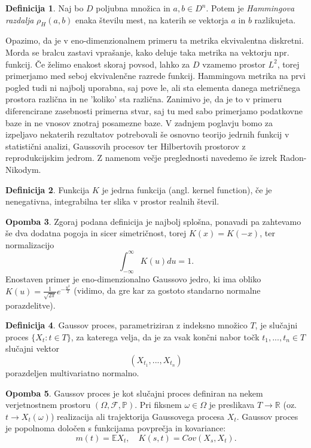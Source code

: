 \documentclass[12pt,a4paper]{amsart}
\theoremstyle{definition} %
\newtheorem{definicija}{Definicija}[section]
\newtheorem{opomba}[definicija]{Opomba}
\theoremstyle{plain} %
\begin{document}
\begin{definicija}
Naj bo $D$ poljubna množica in $a , b \in D^n$. Potem je  \textit{Hammingova razdalja} $\rho_H(a,b)$ enaka številu mest, na katerih se vektorja $a$ in $b$ razlikujeta.
\end{definicija}
Opazimo, da je v eno-dimenzionalnem primeru  ta metrika ekvivalentna diskretni. Morda se bralcu zastavi vprašanje, kako deluje taka metrika na vektorju npr. funkcij. Če želimo enakost skoraj povsod, lahko za $D$ vzamemo prostor $L^2$, torej primerjamo med seboj ekvivalenčne razrede funkcij.  Hammingova metrika na prvi pogled tudi ni najbolj uporabna, saj pove le, ali sta elementa danega metričnega prostora različna in ne 'koliko' sta različna. Zanimivo je, da je to v primeru diferencirane zasebnosti primerna stvar, saj tu med sabo primerjamo podatkovne baze in ne vnosov znotraj posamezne baze. 
\newline
\newline
V zadnjem poglavju bomo za izpeljavo nekaterih rezultatov potrebovali še osnovno teorijo jedrnih funkcij v statistični analizi, Gaussovih procesov ter Hilbertovih prostorov z reprodukcijskim jedrom. Z namenom večje preglednosti navedemo še izrek Radon-Nikodym.
\begin{definicija}
Funkcija $K$ je jedrna funkcija (angl. kernel function), če je nenegativna, integrabilna ter slika v prostor realnih števil.
\end{definicija}
\begin{opomba}
Zgoraj podana definicija je najbolj splošna, ponavadi pa zahtevamo še dva dodatna pogoja in sicer simetričnost, torej $K(x) = K(-x)$, ter normalizacijo
$$
\int_{-\infty}^{\infty} K(u)du=1.
$$
Enostaven primer je eno-dimenzionalno Gaussovo jedro, ki ima obliko $K(u)=\frac{1}{\sqrt{2\pi}}e^{-\frac{u^2}{2}}$ (vidimo, da gre kar za gostoto standarno normalne porazdelitve).
\end{opomba}
\begin{definicija}
Gaussov proces, parametriziran z indeksno množico $T$, je slučajni proces $\{X_t : t \in T\}$, za katerega velja, da je za vsak končni nabor točk $t_1,...,t_n \in T$ slučajni vektor
$$
(X_{t_1},...,X_{t_n})
$$
porazdeljen multivariatno normalno.
\end{definicija}
\begin{opomba}
Gaussov proces je kot slučajni proces definiran na nekem verjetnostnem prostoru  $(\Omega, \mathcal{F}, \mathbb{P})$. Pri fiksnem $\omega \in \Omega$ je preslikava $T \rightarrow \mathbb{R}$ (oz. $t \rightarrow X_t(\omega)$) realizacija ali trajektorija Gaussovega procesa $X_t$. Gaussov proces je popolnoma določen s funkcijama povprečja  in kovariance: 
$$m(t) = \mathbb{E}X_t, \quad K(s,t) = Cov(X_s,X_t).$$
\end{opomba}
\end{document}
